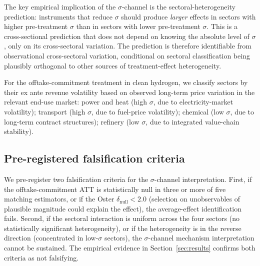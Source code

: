 \documentclass[12pt,a4paper]{article}
\theoremstyle{plain}
\theoremstyle{definition}
\begin{document}
The key empirical implication of the $\sigma$-channel is the sectoral-heterogeneity prediction: instruments that reduce $\sigma$ should produce \emph{larger} effects in sectors with higher pre-treatment $\sigma$ than in sectors with lower pre-treatment $\sigma$. This is a cross-sectional prediction that does not depend on knowing the absolute level of $\sigma$, only on its cross-sectoral variation. The prediction is therefore identifiable from observational cross-sectoral variation, conditional on sectoral classification being plausibly orthogonal to other sources of treatment-effect heterogeneity.

For the offtake-commitment treatment in clean hydrogen, we classify sectors by their ex ante revenue volatility based on observed long-term price variation in the relevant end-use market: power and heat (high $\sigma$, due to electricity-market volatility); transport (high $\sigma$, due to fuel-price volatility); chemical (low $\sigma$, due to long-term contract structures); refinery (low $\sigma$, due to integrated value-chain stability).

\subsection{Pre-registered falsification criteria}
\label{sec:framework-falsifiability}

We pre-register two falsification criteria for the $\sigma$-channel interpretation. First, if the offtake-commitment ATT is statistically null in three or more of five matching estimators, or if the Oster $\delta_{\text{null}} < 2.0$ (selection on unobservables of plausible magnitude could explain the effect), the average-effect identification fails. Second, if the sectoral interaction is uniform across the four sectors (no statistically significant heterogeneity), or if the heterogeneity is in the reverse direction (concentrated in low-$\sigma$ sectors), the $\sigma$-channel mechanism interpretation cannot be sustained. The empirical evidence in Section~\ref{sec:results} confirms both criteria as not falsifying.
\end{document}
